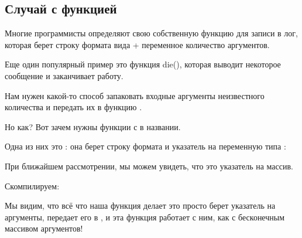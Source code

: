 \subsection{Случай с функцией }

Многие программисты определяют свою собственную функцию для записи в лог, которая берет строку формата 
вида \printf + переменное количество аргументов.

Еще один популярный пример это функция die(), которая выводит некоторое сообщение и заканчивает работу.

Нам нужен какой-то способ запаковать входные аргументы неизвестного количества и передать их в функцию \printf.

Но как?
Вот зачем нужны функции с  в названии.

Одна из них это : она берет строку формата и указатель на переменную типа :



При ближайшем рассмотрении, мы можем увидеть, что  это указатель на массив.

Скомпилируем:



Мы видим, что всё что наша функция делает это просто берет указатель на аргументы, 
передает его в ,
и эта функция работает с ним, как с бесконечным массивом аргументов!


